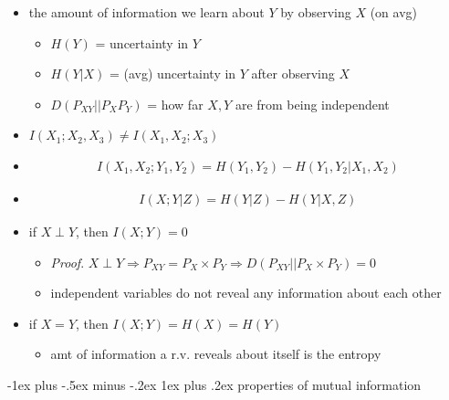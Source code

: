 \documentclass[10pt, landscape]{article}
\makeatletter
\renewcommand{\subsubsection}{\@startsection{subsubsection}{3}{0mm}%
  {-1ex plus -.5ex minus -.2ex}%
  {1ex plus .2ex}%
{\normalfont\small\bfseries}}%
\makeatother
\begin{document}
\begin{multicols*}{4}
  \begin{itemize}

    \item {} the amount of information we learn about $Y$ by observing $X$ (on avg)
      \begin{itemize}
        \item $H(Y)$ = uncertainty in  $Y$ 
        \item $H(Y \vert X)$ = (avg) uncertainty in $Y$ after observing $X$
        \item $D(P_{XY}\vert\vert P_X P_Y)$ = how far $X,Y$ are from being independent
      \end{itemize}
    \item $I(X_1;X_2,X_3) \neq I(X_1, X_2;X_3)$ 
    \item {} 
      \begin{align*}
        I(X_1, X_2 ; Y_1, Y_2) = H(Y_1, Y_2) - H(Y_1, Y_2 \vert X_1, X_2)
      \end{align*}
    \item {} 
      \begin{align*}
        I(X;Y \vert Z) = H(Y \vert Z) - H(Y \vert X,Z)
      \end{align*}
    \item if $X \perp Y$, then $I(X;Y) = 0$ 
      \begin{itemize}
        \item \textit{Proof}. $X \perp Y \Rightarrow P_{XY} = P_X \times P_Y \Rightarrow D(P_{XY} \vert \vert P_X \times P_Y) = 0$
        \item independent variables do not reveal any information about each other
      \end{itemize}
    \item if  $X=Y$, then $I(X;Y) = H(X) = H(Y)$
      \begin{itemize}
        \item amt of information a r.v. reveals about itself is the entropy
      \end{itemize}
  \end{itemize}

  \subsubsection{properties of mutual information}


\end{multicols*}
\end{document}
